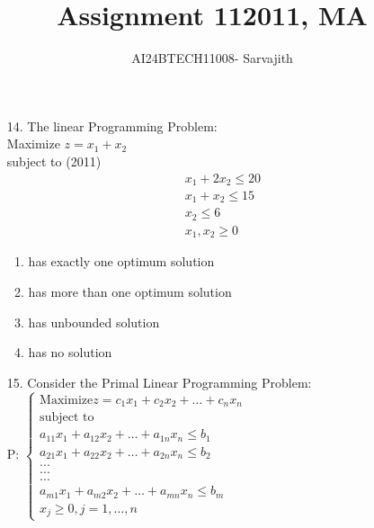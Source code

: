 \documentclass[journal]{IEEEtran}
\begin{document}

\vspace{3cm}


\author{AI24BTECH11008- Sarvajith
}
\title{Assignment 11}
{\let\newpage\relax\maketitle}
\title{2011, MA}
\renewcommand{\thefigure}{\theenumi}
\renewcommand{\thetable}{\theenumi}
\setlength{\intextsep}{10pt} %
\renewcommand{\thetable}{\theenumi}
\begin{enumerate}
    \item[14.] The linear Programming Problem:\\Maximize $z=x_1+x_2$\\subject to \hfill (2011)
    \begin{align*}
     x_1 + 2x_2 \leq 20\\
     x_1 + x_2 \leq 15\\
     x_2\leq 6\\
     x_1, x_2 \geq 0
    \end{align*}
    \begin{enumerate}[label=(\Alph*)]
        \item has exactly one optimum solution
        \item has more than one optimum solution
        \item has unbounded solution
        \item has no solution
    \end{enumerate}
    \item[15.] Consider the Primal Linear Programming Problem:\\
    P: $\begin{cases} \text{Maximize} z = c_1x_1+c_2x_2+\ldots+c_nx_n\\\text{subject to}\\a_{11}x_1+a_{12}x_2+\ldots+a_{1n}x_n \leq b_1\\a_{21}x_1+a_{22}x_2+\ldots+a_{2n}x_n \leq b_2\\.      .      .\\.      .      .\\.      .      .\\a_{m1}x_1+a_{m2}x_2+\ldots+a_{mn}x_n \leq b_m\\ x_j \geq 0, j=1,\ldots,n\end{cases}$

\end{enumerate}
\end{document}
